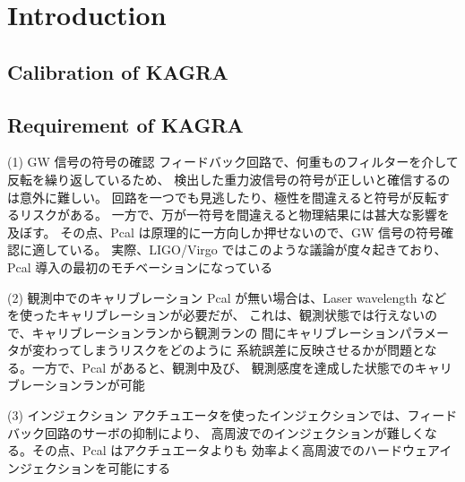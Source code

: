 
\chapter{Introduction} %

\label{Chapter1} %


\newcommand{\keyword}[1]{\textbf{#1}}
\newcommand{\tabhead}[1]{\textbf{#1}}
\newcommand{\code}[1]{\texttt{#1}}
\newcommand{\file}[1]{\texttt{\bfseries#1}}
\newcommand{\option}[1]{\texttt{\itshape#1}}


\section{Calibration of KAGRA}
 

\section{Requirement of KAGRA}
(1) GW 信号の符号の確認
フィードバック回路で、何重ものフィルターを介して反転を繰り返しているため、
検出した重力波信号の符号が正しいと確信するのは意外に難しい。
回路を一つでも見逃したり、極性を間違えると符号が反転するリスクがある。
一方で、万が一符号を間違えると物理結果には甚大な影響を及ぼす。
その点、Pcal は原理的に一方向しか押せないので、GW 信号の符号確認に適している。
実際、LIGO/Virgo ではこのような議論が度々起きており、
Pcal 導入の最初のモチベーションになっている

(2) 観測中でのキャリブレーション
Pcal が無い場合は、Laser wavelength などを使ったキャリブレーションが必要だが、
これは、観測状態では行えないので、キャリブレーションランから観測ランの
間にキャリブレーションパラメータが変わってしまうリスクをどのように
系統誤差に反映させるかが問題となる。一方で、Pcal があると、観測中及び、
観測感度を達成した状態でのキャリブレーションランが可能

(3) インジェクション
アクチュエータを使ったインジェクションでは、フィードバック回路のサーボの抑制により、
高周波でのインジェクションが難しくなる。その点、Pcal はアクチュエータよりも
効率よく高周波でのハードウェアインジェクションを可能にする

